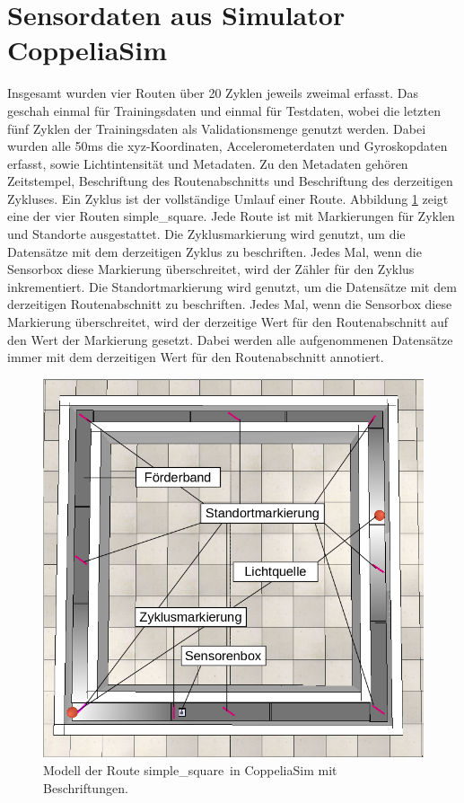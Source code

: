 \section{Sensordaten aus Simulator CoppeliaSim}
\label{sec:data_simulated_sensordata}
Insgesamt wurden vier Routen über 20 Zyklen jeweils zweimal erfasst.
Das geschah einmal für Trainingsdaten und einmal für Testdaten, wobei die letzten fünf Zyklen der
Trainingsdaten als Validationsmenge genutzt werden.
Dabei wurden alle 50ms die xyz-Koordinaten, Accelerometerdaten und Gyroskopdaten erfasst, sowie Lichtintensität und Metadaten.
Zu den Metadaten gehören Zeitstempel, Beschriftung des Routenabschnitts und Beschriftung des derzeitigen Zykluses.
Ein Zyklus ist der vollständige Umlauf einer Route.
\newline
\newline
Abbildung \ref{fig:simple_square_labeled} zeigt eine der vier Routen \glqq simple\_square\grqq.
Jede Route ist mit Markierungen für Zyklen und Standorte ausgestattet.
Die Zyklusmarkierung wird genutzt, um die Datensätze mit dem derzeitigen Zyklus zu beschriften.
Jedes Mal, wenn die Sensorbox diese Markierung überschreitet, wird der Zähler für den Zyklus inkrementiert.
\newpage
Die Standortmarkierung wird genutzt, um die Datensätze mit dem derzeitigen Routenabschnitt zu beschriften.
Jedes Mal, wenn die Sensorbox diese Markierung überschreitet, wird der derzeitige Wert für den Routenabschnitt auf den Wert der Markierung gesetzt.
Dabei werden alle aufgenommenen Datensätze immer mit dem derzeitigen Wert für den Routenabschnitt annotiert.
\begin{figure}[h!]
    \centering
    \includegraphics[width=0.75\linewidth]{images/simple_square_labeled.png}
    \caption{Modell der Route \glqq simple\_square\grqq\ in CoppeliaSim mit Beschriftungen.}
    \label{fig:simple_square_labeled}
\end{figure}
